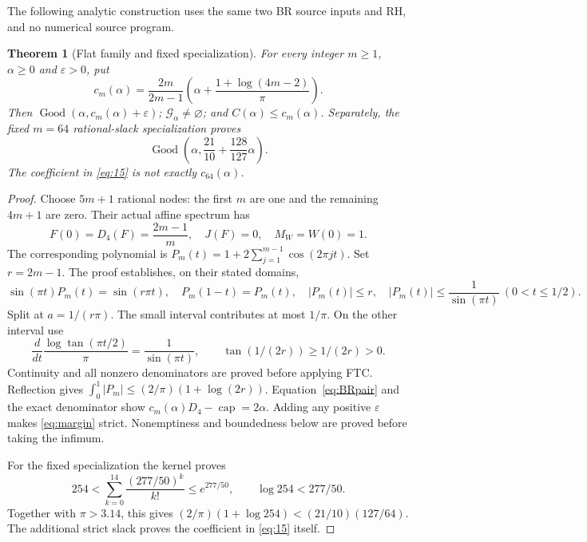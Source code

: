 \documentclass[11pt]{article}
\newtheorem{theorem}{Theorem}
\newcommand{\Good}{\operatorname{Good}}
\begin{document}
The following analytic construction uses the same two BR source inputs and
RH, and no numerical source program.

\begin{theorem}[Flat family and fixed specialization]\label{thm:flat}
For every integer \(m\ge1\), \(\alpha\ge0\) and \(\varepsilon>0\), put
\[
 c_m(\alpha)=\frac{2m}{2m-1}
 \left(\alpha+\frac{1+\log(4m-2)}{\pi}\right).
 \tag{14}
\]
Then \(\Good(\alpha,c_m(\alpha)+\varepsilon)\);
\(\mathcal G_\alpha\ne\varnothing\); and \(C(\alpha)\le c_m(\alpha)\).
Separately, the fixed \(m=64\) rational-slack specialization proves
\[
 \Good\!\left(\alpha,\frac{21}{10}+\frac{128}{127}\alpha\right).
 \tag{15}\label{eq:15}
\]
The coefficient in \eqref{eq:15} is not exactly \(c_{64}(\alpha)\).
\end{theorem}
\begin{proof}
Choose \(5m+1\) rational nodes: the first \(m\) are one and the remaining
\(4m+1\) are zero. Their actual affine spectrum has
\[
 F(0)=D_4(F)=\frac{2m-1}{m},\quad J(F)=0,\quad M_W=W(0)=1.
\]
The corresponding polynomial is
\(P_m(t)=1+2\sum_{j=1}^{m-1}\cos(2\pi jt)\). Set \(r=2m-1\).
The proof establishes, on their stated domains,
\[
 \sin(\pi t)P_m(t)=\sin(r\pi t),\quad
 P_m(1-t)=P_m(t),\quad |P_m(t)|\le r,\quad
 |P_m(t)|\le\frac1{\sin(\pi t)}\ (0<t\le1/2).
\]
Split at \(a=1/(r\pi)\). The small interval contributes at most \(1/\pi\).
On the other interval use
\[
 \frac{d}{dt}\frac{\log\tan(\pi t/2)}{\pi}
 =\frac1{\sin(\pi t)},\qquad
 \tan(1/(2r))\ge1/(2r)>0.
\]
Continuity and all nonzero denominators are proved before applying FTC.
Reflection gives
\(\int_0^1|P_m|\le(2/\pi)(1+\log(2r))\).
Equation~\eqref{eq:BRpair} and the exact denominator show
\(c_m(\alpha)D_4-\operatorname{cap}=2\alpha\).
Adding any positive \(\varepsilon\) makes \eqref{eq:margin} strict.
Nonemptiness and boundedness below are proved before taking the infimum.

For the fixed specialization the kernel proves
\[
 254<\sum_{k=0}^{14}\frac{(277/50)^k}{k!}\le e^{277/50},
 \qquad \log254<277/50.
\]
Together with \(\pi>3.14\), this gives
\((2/\pi)(1+\log254)<(21/10)(127/64)\).
The additional strict slack proves the coefficient in \eqref{eq:15} itself.
\end{proof}
\end{document}
